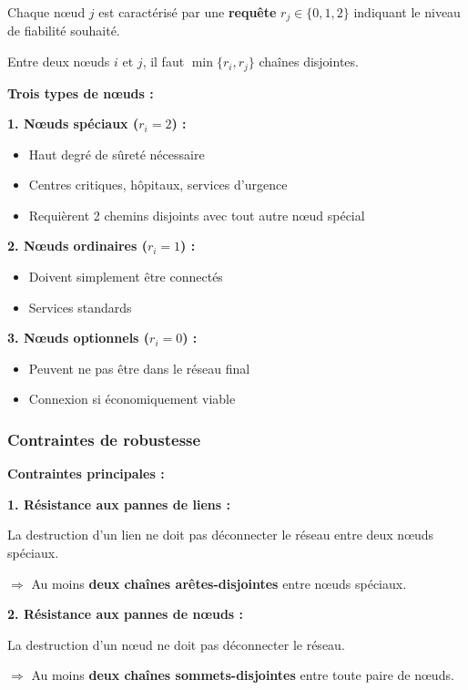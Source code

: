\documentclass[12pt,a4paper]{article}
\begin{document}
\begin{definition}
Chaque nœud $j$ est caractérisé par une \textcolor{titrebleu}{\textbf{requête}} $r_j \in \{0, 1, 2\}$ indiquant le niveau de fiabilité souhaité.

Entre deux nœuds $i$ et $j$, il faut $\min\{r_i, r_j\}$ chaînes disjointes.

\textbf{Trois types de nœuds :}

\textbf{1. Nœuds spéciaux ($r_i = 2$) :}
\begin{itemize}
    \item Haut degré de sûreté nécessaire
    \item Centres critiques, hôpitaux, services d'urgence
    \item Requièrent 2 chemins disjoints avec tout autre nœud spécial
\end{itemize}

\textbf{2. Nœuds ordinaires ($r_i = 1$) :}
\begin{itemize}
    \item Doivent simplement être connectés
    \item Services standards
\end{itemize}

\textbf{3. Nœuds optionnels ($r_i = 0$) :}
\begin{itemize}
    \item Peuvent ne pas être dans le réseau final
    \item Connexion si économiquement viable
\end{itemize}
\end{definition}

\subsubsection{Contraintes de robustesse}

\begin{important}
\textbf{Contraintes principales :}

\textbf{1. Résistance aux pannes de liens :}

La destruction d'un lien ne doit pas déconnecter le réseau entre deux nœuds spéciaux.

$\Rightarrow$ Au moins \textcolor{titrebleu}{\textbf{deux chaînes arêtes-disjointes}} entre nœuds spéciaux.

\textbf{2. Résistance aux pannes de nœuds :}

La destruction d'un nœud ne doit pas déconnecter le réseau.

$\Rightarrow$ Au moins \textcolor{defvert}{\textbf{deux chaînes sommets-disjointes}} entre toute paire de nœuds.
\end{important}
\end{document}
